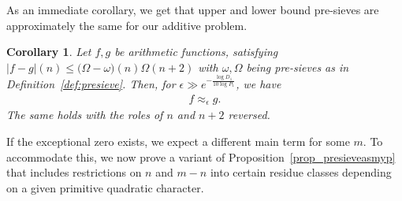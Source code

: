 \documentclass[12pt]{amsart}
\newtheorem{corollary}[theorem]{Corollary}
\theoremstyle{definition}
\theoremstyle{remark}
\numberwithin{equation}{section}
\newcommand{\1}{\mathbf{1}}
\begin{document}
As an immediate corollary, we get that upper and lower bound pre-sieves are approximately the same for our additive problem.

\begin{corollary}\label{cor_upperlowersieve}
	Let $f,g$ be arithmetic functions, satisfying $|f-g|(n)\leq \bigl(\Omega-\omega \bigr)(n)\Omega(n+2)$ with $\omega, \Omega$ being pre-sieves as in Definition~\ref{def:presieve}. Then, for $\epsilon \gg  e^{-\frac{\log D_1}{10\log P_1}}$, we have
\begin{align*}
	f\approx_\epsilon g.
\end{align*}
The same holds with the roles of $n$ and $n+2$ reversed.
\end{corollary}

If the exceptional zero exists, we expect a different main term for some $m$. To accommodate this, we now prove a variant of Proposition~\ref{prop_presieveasmyp} that includes restrictions on $n$ and $m-n$ into certain residue classes depending on a given primitive quadratic character.
\end{document}
